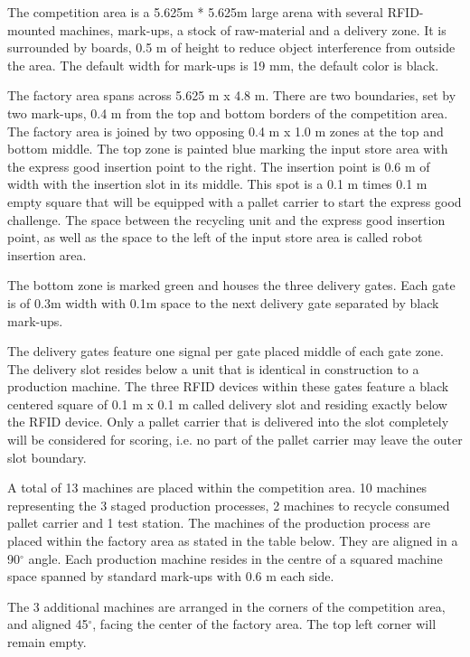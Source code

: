 \documentclass[12pt,twoside]{article}
\begin{document}
The competition area is a 5.625m * 5.625m large arena with several
RFID-mounted machines, mark-ups, a stock of raw-material and a
delivery zone. It is surrounded by boards, 0.5 m of height to reduce
object interference from outside the area. The default width for
mark-ups is 19 mm, the default color is black.

The factory area spans across 5.625 m x 4.8 m. There are two
boundaries, set by two mark-ups, 0.4 m from the top and bottom borders
of the competition area. The factory area is joined by two opposing
0.4 m x 1.0 m zones at the top and bottom middle. The top zone is
painted blue marking the input store area with the express good
insertion point to the right. The insertion point is 0.6 m of width
with the insertion slot in its middle. This spot is a 0.1 m times 0.1
m empty square that will be equipped with a pallet carrier to start
the express good challenge. The space between the recycling unit and
the express good insertion point, as well as the space to the left of
the input store area is called robot insertion area.

The bottom zone is marked green and houses the three delivery gates.
Each gate is of 0.3m width with 0.1m space to the next delivery gate
separated by black mark-ups.

The delivery gates feature one signal per gate placed middle of each
gate zone. The delivery slot resides below a unit that is identical in
construction to a production machine. The three RFID devices within
these gates feature a black centered square of 0.1 m x 0.1 m called
delivery slot and residing exactly below the RFID device. Only a
pallet carrier that is delivered into the slot completely will be
considered for scoring, i.e. no part of the pallet carrier may leave
the outer slot boundary.

A total of 13 machines are placed within the competition area. 10
machines representing the 3 staged production processes, 2 machines to
recycle consumed pallet carrier and 1 test station. The machines of
the production process are placed within the factory area as stated in
the table below. They are aligned in a 90$^\circ$ angle. Each production
machine resides in the centre of a squared machine space spanned by
standard mark-ups with 0.6 m each side.

The 3 additional machines are arranged in the corners of the
competition area, and aligned 45$^\circ$, facing the center of the factory
area. The top left corner will remain empty.
\end{document}
